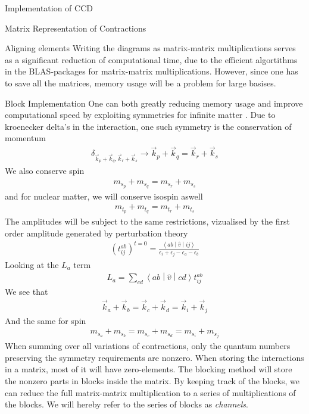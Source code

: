 \documentclass[twoside,english]{uiofysmaster}
\begin{document}
\begin{chapter}{Implementation of CCD}
\begin{section}{Matrix Representation of Contractions}
\begin{subsection}{Aligning elements}
			Writing the diagrams as matrix-matrix multiplications serves as a significant reduction of computational time, due to the efficient algortithms in the BLAS-packages for matrix-matrix multiplications. However, since one has to save all the matrices, memory usage will be a problem for large basises. 
		\end{subsection}

	\end{section}

	\begin{section}{Block Implementation}
		One can both greatly reducing memory usage and improve computational speed by exploiting symmetries for infinite matter . Due to kroenecker delta's in the interaction, one such symmetry is the conservation of momentum
		\begin{align}
			\delta_{\vec k_p + \vec k_q, \vec k_r + \vec k_s} \rightarrow \vec k_p + \vec k_q = \vec k_r + \vec k_s
		\end{align}
		We also conserve spin 
		\begin{align}
			m_{s_p} + m_{s_q} = m_{s_r} + m_{s_s}
		\end{align}
		and for nuclear matter, we will conserve isospin aswell
		\begin{align}
			m_{t_p} + m_{t_q} = m_{t_r} + m_{t_s}
		\end{align}
		The amplitudes will be subject to the same restrictions, vizualised by the first order amplitude generated by perturbation theory
		\begin{align}
			(t_{ij}^{ab})^{t=0} = \frac{\left<ab\middle|\hat v\middle|ij\right>}{\epsilon_i + \epsilon_j - \epsilon_a - \epsilon_b}
		\end{align}
		Looking at the $L_a$ term
		\begin{align}
			L_a = \sum_{cd} \left<ab\middle|\hat v\middle|cd\right> t_{ij}^{ab}
		\end{align}
		We see that 
		\begin{align}
			\vec k_a + \vec k_b = \vec k_c + \vec k_d = \vec k_i + \vec k_j
		\end{align}
		And the same for spin
		\begin{align}
			m_{s_a} + m_{s_b} = m_{s_c} + m_{s_d} = m_{s_i} + m_{s_j} 
		\end{align}
		When summing over all variations of contractions, only the quantum numbers preserving the symmetry requirements are nonzero. When storing the interactions in a matrix, most of it will have zero-elements. The blocking method will store the nonzero parts in blocks inside the matrix. By keeping track of the blocks, we can reduce the full matrix-matrix multiplication to a series of multiplications of the blocks. We will hereby refer to the series of blocks as \textit{channels}.


\end{section}
\end{chapter}
\end{document}
